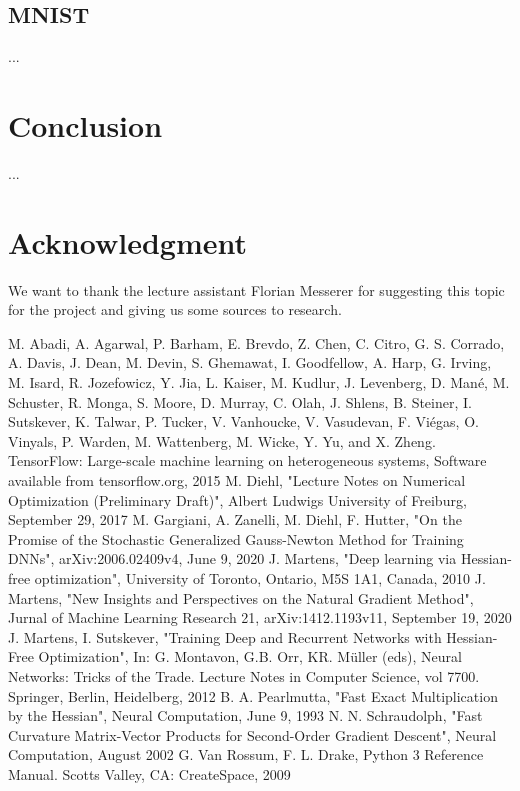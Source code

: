 \documentclass[conference]{IEEEtran}
\begin{document}
\subsection{MNIST}
...

\section{Conclusion}
...

\section*{Acknowledgment}
We want to thank the lecture assistant Florian Messerer for suggesting this topic for the project and giving us some sources to research. 


\begin{thebibliography}{00}
 M. Abadi, A. Agarwal, P. Barham, E. Brevdo,
Z. Chen, C. Citro, G. S. Corrado, A. Davis,
J. Dean, M. Devin, S. Ghemawat, I. Goodfellow,
A. Harp, G. Irving, M. Isard, R. Jozefowicz, Y. Jia,
L. Kaiser, M. Kudlur, J. Levenberg, D. Mané, M. Schuster,
R. Monga, S. Moore, D. Murray, C. Olah, J. Shlens,
B. Steiner, I. Sutskever, K. Talwar, P. Tucker,
V. Vanhoucke, V. Vasudevan, F. Viégas,
O. Vinyals, P. Warden, M. Wattenberg, M. Wicke,
Y. Yu, and X. Zheng.
TensorFlow: Large-scale machine learning on heterogeneous systems, Software available from tensorflow.org, 2015	
 M. Diehl, "Lecture Notes on Numerical Optimization (Preliminary Draft)", Albert Ludwigs University of Freiburg, September 29, 2017	
 M. Gargiani, A. Zanelli, M. Diehl, F. Hutter, "On the Promise of the Stochastic Generalized Gauss-Newton Method for Training DNNs",  arXiv:2006.02409v4, June 9, 2020 
 J. Martens, "Deep learning via Hessian-free optimization", University of Toronto, Ontario, M5S 1A1, Canada, 2010
 J. Martens, "New Insights and Perspectives on the Natural Gradient Method", Jurnal of Machine Learning Research 21, arXiv:1412.1193v11, September 19, 2020
 J. Martens, I. Sutskever, "Training Deep and Recurrent Networks with Hessian-Free Optimization", In: G. Montavon, G.B. Orr, KR. Müller (eds), Neural Networks: Tricks of the Trade. Lecture Notes in Computer Science, vol 7700. Springer, Berlin, Heidelberg, 2012
 B. A. Pearlmutta, "Fast Exact Multiplication by the Hessian", Neural Computation, June 9, 1993
 N. N. Schraudolph, "Fast Curvature Matrix-Vector Products for Second-Order
Gradient Descent", Neural Computation, August 2002
 G. Van Rossum, F. L. Drake, Python 3 Reference Manual. Scotts Valley, CA: CreateSpace, 2009
\end{thebibliography}
\end{document}
